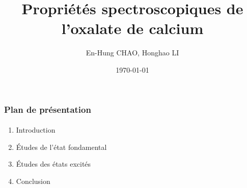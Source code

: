 \documentclass[french]{beamer}
\title{Propriétés spectroscopiques de l'oxalate de calcium}
\author{En-Hung CHAO, Honghao LI}
\institute{École Polytechnique}
\date{\today}
\begin{document}
\graphicspath{{../images/}}

\begin{frame}
\titlepage%
\end{frame}
\begin{frame}
\frametitle{Plan de présentation}
\framesubtitle{}
\begin{enumerate}
\item Introduction
\item Études de l'état fondamental
\item Études des états excités
\item Conclusion
\end{enumerate}
\end{frame}
\end{document}
